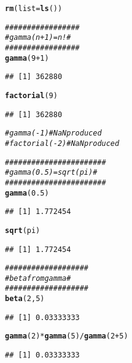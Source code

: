 \documentclass[12pt,oneside,english,american,flalign]{book}\usepackage[]{graphicx}\usepackage[]{color}
\makeatletter
\newcommand{\hlnum}[1]{\textcolor[rgb]{0.686,0.059,0.569}{#1}}%
\newcommand{\hlcom}[1]{\textcolor[rgb]{0.678,0.584,0.686}{\textit{#1}}}%
\newcommand{\hlopt}[1]{\textcolor[rgb]{0,0,0}{#1}}%
\newcommand{\hlstd}[1]{\textcolor[rgb]{0.345,0.345,0.345}{#1}}%
\newcommand{\hlkwc}[1]{\textcolor[rgb]{0.333,0.667,0.333}{#1}}%
\newcommand{\hlkwd}[1]{\textcolor[rgb]{0.737,0.353,0.396}{\textbf{#1}}}%
\newenvironment{kframe}{%
 \def\at@end@of@kframe{}%
 \ifinner\ifhmode%
  \def\at@end@of@kframe{\end{minipage}}%
  \begin{minipage}{\columnwidth}%
 \fi\fi%
 \def\FrameCommand##1{\hskip\@totalleftmargin \hskip-\fboxsep
 \colorbox{shadecolor}{##1}\hskip-\fboxsep
     \hskip-\linewidth \hskip-\@totalleftmargin \hskip\columnwidth}%
 \MakeFramed {\advance\hsize-\width
   \@totalleftmargin\z@ \linewidth\hsize
   \@setminipage}}%
 {\par\unskip\endMakeFramed%
 \at@end@of@kframe}
\newenvironment{knitrout}{}{} %
\makeatother
\begin{document}
\begin{doublespace}
\begin{knitrout}
\color{fgcolor}\begin{kframe}
\begin{alltt}
\hlkwd{rm}\hlstd{(}\hlkwc{list}\hlstd{=}\hlkwd{ls}\hlstd{())}

\hlcom{#################}
\hlcom{# gamma(n+1)=n! #}
\hlcom{#################}
\hlkwd{gamma}\hlstd{(}\hlnum{9}\hlopt{+}\hlnum{1}\hlstd{)}
\end{alltt}
\begin{verbatim}
## [1] 362880
\end{verbatim}
\begin{alltt}
\hlkwd{factorial}\hlstd{(}\hlnum{9}\hlstd{)}
\end{alltt}
\begin{verbatim}
## [1] 362880
\end{verbatim}
\begin{alltt}
\hlcom{# gamma(-1) # NaN produced}
\hlcom{# factorial(-2) # NaN produced}

\hlcom{#######################}
\hlcom{# gamma(0.5)=sqrt(pi) #}
\hlcom{#######################}
\hlkwd{gamma}\hlstd{(}\hlnum{0.5}\hlstd{)}
\end{alltt}
\begin{verbatim}
## [1] 1.772454
\end{verbatim}
\begin{alltt}
\hlkwd{sqrt}\hlstd{(pi)}
\end{alltt}
\begin{verbatim}
## [1] 1.772454
\end{verbatim}
\begin{alltt}
\hlcom{###################}
\hlcom{# beta from gamma #}
\hlcom{###################}
\hlkwd{beta}\hlstd{(}\hlnum{2}\hlstd{,}\hlnum{5}\hlstd{)}
\end{alltt}
\begin{verbatim}
## [1] 0.03333333
\end{verbatim}
\begin{alltt}
\hlkwd{gamma}\hlstd{(}\hlnum{2}\hlstd{)}\hlopt{*}\hlkwd{gamma}\hlstd{(}\hlnum{5}\hlstd{)}\hlopt{/}\hlkwd{gamma}\hlstd{(}\hlnum{2}\hlopt{+}\hlnum{5}\hlstd{)}
\end{alltt}
\begin{verbatim}
## [1] 0.03333333
\end{verbatim}
\end{kframe}
\end{knitrout}
\end{doublespace}
\end{document}
